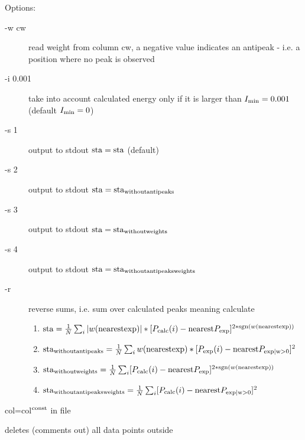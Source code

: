 \begin{description}
Options:
\begin{description}
\item [-w cw]           read weight from column cw, a negative value indicates an antipeak - i.e.
                a position where no peak is observed 
\item [-i 0.001]       take into account calculated energy only if it is larger than $I_{\rm min}=0.001$ (default $I_{\rm min}=0$)
\item [-s 1 ]             output to stdout ${\rm sta}={\rm sta}$ (default)
\item [-s 2 ]             output to stdout ${\rm sta}={\rm sta}_{\rm without antipeaks }$ 
\item [-s 3 ]             output to stdout ${\rm sta}={\rm sta}_{\rm without weights}$
\item [-s 4 ]             output to stdout ${\rm sta}={\rm sta}_{\rm without antipeaks weights}$
\item [-r ]             reverse sums, i.e. sum over calculated peaks meaning calculate
   \begin{enumerate}
\item ${\rm sta}                               = \frac{1}{N}  \sum_{i} |w({\rm nearestexp})|*[P_{\rm calc}(i) - {\rm nearest}P_{\rm exp}]^{2*{\rm sgn}(w({\rm nearestexp}))}$
\item ${\rm sta}_{\rm without antipeaks }            = \frac{1}{N}  \sum_{i}  w({\rm nearestexp})*[P_{\rm exp}(i) - {\rm nearest}P_{\rm exp|w>0}]^2$
\item ${\rm sta}_{\rm without weights}               = \frac{1}{N}  \sum_{i} [P_{\rm calc}(i) - {\rm nearest}P_{\rm exp}]^{2*{\rm sgn}(w({\rm nearestexp}))}$
\item ${\rm sta}_{\rm without antipeaks weights}     = \frac{1}{N}  \sum_{i} [P_{\rm calc}(i) - {\rm nearest}P_{\rm exp|w>0}]^2$
\end{enumerate}
\end{description}
\item [\prg potcol\index{potcol}\label{potcol} col const file:]  col=col$^{\rm const}$ in file
\item [\prg range\index{range}\label{range} col min max file:] deletes (comments out) all data points outside %

\end{description}
